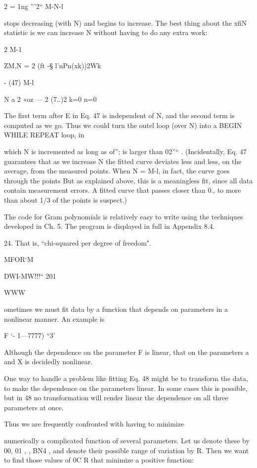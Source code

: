 {{{{{{{2
= 1ng
”'2“ M-N-l

stops decreasing (with N) and begins to increase.
The best thing about the xﬁN statistic is we can increase N without
having to do any extra work:

2 M-1

ZM,N = 2 (ft -§ l’nPn(xk))2Wk

- (47)
M-l

N
a 2 «oz — 2 (7..)2
k=0 n=0

The ﬁrst term after E in Eq. 47 is independent of N, and the
second term is computed as we go. Thus we could turn the outel
loop (over N) into a BEGIN WHILE REPEAT loop, in

which N is incremented as long as of”; is larger than 02”“ .
(Incidentally, Eq. 47 guarantees that as we increase N the ﬁtted
curve deviates less and less, on the average, from the measured
points. When N = M-l, in fact, the curve goes through the points
But as explained above, this is a meaningless ﬁt, since all data
contain measurement errors. A ﬁtted curve that passes closer
than 0., to more than about 1/3 of the points is suspect.)

The code for Gram polynomials is relatively easy to write using
the techniques developed in Ch. 5. The program is displayed in
full in Appendix 8.4.

 

24. That is, “chi-squared per degree of freedom".

MFOR‘M

DWI-MW!!!“ 201

WWW

ometimes we must ﬁt data by a function that depends on
parameters in a nonlinear manner. An example is

F
‘- 1—7777) “3’

Although the dependence on the parameter F is linear, that on
the parameters a and X is decidedly nonlinear.

One way to handle a problem like ﬁtting Eq. 48 might be to
transform the data, to make the dependence on the parameters
linear. In some cases this is possible, but in 48 no transformation
will render linear the dependence on all three parameters at once.

Thus we are frequently confronted with having to minimize

numerically a complicated function of several parameters. Let
us denote these by 00, 01 , , BN4 , and denote their possible
range of variation by R. Then we want to ﬁnd those values of
{ 0}C R that minimize a positive function:

}}}}}}}
